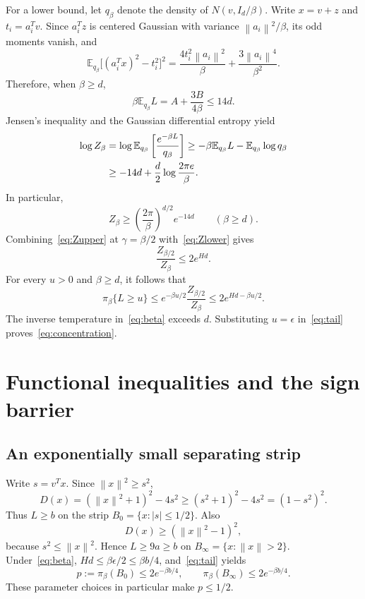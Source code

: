 \documentclass[11pt,letterpaper]{article}
\numberwithin{equation}{section}
\theoremstyle{remark}
\newcommand{\E}{\mathbb E}
\newcommand{\1}{\mathbf 1}
\newcommand{\norm}[1]{\left\lVert#1\right\rVert}
\newcommand{\abs}[1]{\left\lvert#1\right\rvert}
\begin{document}
For a lower bound, let $q_\beta$ denote the density of $N(v,I_d/\beta)$. Write $x=v+z$ and $t_i=a_i^Tv$. Since $a_i^Tz$ is centered Gaussian with variance $\norm{a_i}^2/\beta$, its odd moments vanish, and
\[
 \E_{q_\beta}\big[(a_i^Tx)^2-t_i^2\big]^2
 =\frac{4t_i^2\norm{a_i}^2}{\beta}
  +\frac{3\norm{a_i}^4}{\beta^2}.
\]
Therefore, when $\beta\ge d$,
\begin{equation}\label{eq:EL}
 \beta\E_{q_\beta}L=A+\frac{3B}{4\beta}\le14d.
\end{equation}
Jensen's inequality and the Gaussian differential entropy yield
\begin{align}
 \log Z_\beta
 &=\log\E_{q_\beta}\left[\frac{e^{-\beta L}}{q_\beta}\right]
 \ge-\beta\E_{q_\beta}L-\E_{q_\beta}\log q_\beta\notag\\
 &\ge-14d+\frac d2\log\frac{2\pi e}{\beta}.
\end{align}
In particular,
\begin{equation}\label{eq:Zlower}
 Z_\beta\ge\left(\frac{2\pi}{\beta}\right)^{d/2}e^{-14d}
 \qquad(\beta\ge d).
\end{equation}
Combining~\eqref{eq:Zupper} at $\gamma=\beta/2$ with~\eqref{eq:Zlower} gives
\begin{equation}\label{eq:Zratio}
 \frac{Z_{\beta/2}}{Z_\beta}\le2e^{Hd}.
\end{equation}
For every $u>0$ and $\beta\ge d$, it follows that
\begin{equation}\label{eq:tail}
 \pi_\beta\{L\ge u\}
 \le e^{-\beta u/2}\frac{Z_{\beta/2}}{Z_\beta}
 \le2e^{Hd-\beta u/2}.
\end{equation}
The inverse temperature in~\eqref{eq:beta} exceeds $d$. Substituting $u=\epsilon$ in~\eqref{eq:tail} proves~\eqref{eq:concentration}.

\section{Functional inequalities and the sign barrier}\label{sec:functional}

\subsection{An exponentially small separating strip}

Write $s=v^Tx$. Since $\norm x^2\ge s^2$,
\begin{equation}\label{eq:barrier}
 D(x)=(\norm x^2+1)^2-4s^2
 \ge(s^2+1)^2-4s^2=(1-s^2)^2.
\end{equation}
Thus $L\ge b$ on the strip $B_0=\{x:\abs s\le1/2\}$. Also
\begin{equation}\label{eq:radialbarrier}
 D(x)\ge(\norm x^2-1)^2,
\end{equation}
because $s^2\le\norm x^2$. Hence $L\ge9a\ge b$ on $B_\infty=\{x:\norm x>2\}$. Under~\eqref{eq:beta},
$Hd\le\beta\epsilon/2\le\beta b/4$, and~\eqref{eq:tail} yields
\begin{equation}\label{eq:stripmass}
 p:=\pi_\beta(B_0)\le2e^{-\beta b/4},
 \qquad \pi_\beta(B_\infty)\le2e^{-\beta b/4}.
\end{equation}
These parameter choices in particular make $p\le1/2$.
\end{document}
